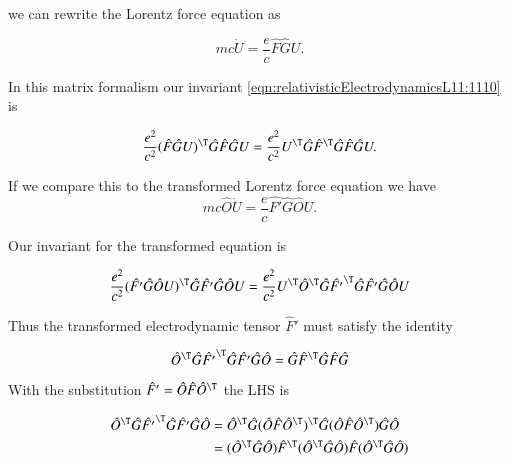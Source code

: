 we can rewrite the Lorentz force equation as

\begin{equation}\label{eqn:relativisticElectrodynamicsL11:1150}
m c \dot{U} = \frac{e}{c} \hat{F} \hat{G} U.
\end{equation}

In this matrix formalism our invariant \ref{eqn:relativisticElectrodynamicsL11:1110} is

\begin{equation}\label{eqn:relativisticElectrodynamicsL11:1200}
\frac{e^2}{c^2} (\hat{F} \hat{G} U)^\T \hat{G} \hat{F} \hat{G} U
=
\frac{e^2}{c^2} U^\T \hat{G} \hat{F}^\T \hat{G} \hat{F} \hat{G} U.
\end{equation}

If we compare this to the transformed Lorentz force equation we have
\begin{equation}\label{eqn:relativisticElectrodynamicsL11:1220}
m c \hat{O} \dot{U} = \frac{e}{c} \hat{F'} \hat{G} \hat{O} U.
\end{equation}

Our invariant for the transformed equation is

\begin{align*}
\frac{e^2}{c^2} (\hat{F'} \hat{G} \hat{O} U)^\T \hat{G} \hat{F'} \hat{G} \hat{O} U
&=
\frac{e^2}{c^2} U^\T \hat{O}^\T \hat{G} \hat{F'}^\T \hat{G} \hat{F'} \hat{G} \hat{O} U \\
\end{align*}

Thus the transformed electrodynamic tensor $\hat{F}'$ must satisfy the identity

\begin{equation}\label{eqn:relativisticElectrodynamicsL11:1240}
\hat{O}^\T \hat{G} \hat{F'}^\T \hat{G} \hat{F'} \hat{G} \hat{O} = \hat{G} \hat{F}^\T \hat{G} \hat{F} \hat{G} 
\end{equation}

With the substitution $\hat{F}' = \hat{O} \hat{F} \hat{O}^\T$ the LHS is

\begin{align*}
\hat{O}^\T \hat{G} \hat{F'}^\T \hat{G} \hat{F'} \hat{G} \hat{O} 
&=
\hat{O}^\T \hat{G} ( \hat{O} \hat{F} \hat{O}^\T)^\T
\hat{G} 
(\hat{O} \hat{F} \hat{O}^\T)
\hat{G} \hat{O}  \\
&=
(\hat{O}^\T \hat{G} \hat{O}) \hat{F}^\T (\hat{O}^\T \hat{G} \hat{O}) \hat{F} (\hat{O}^\T \hat{G} \hat{O}) \\
\end{align*}

